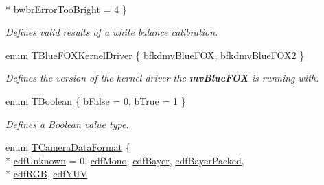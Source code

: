 \begin{DoxyCompactItemize}
\\*
\hyperlink{group___common_interface_ggac25746f6cbcf893d3ca308d3e978f39da1440b9f3f541551da4d0d8fe022587f4}{bwbr\+Error\+Too\+Bright} = 4
 \}
\begin{DoxyCompactList}\small\item\em Defines valid results of a white balance calibration. \end{DoxyCompactList}\item 
enum \hyperlink{group___common_interface_ga345b9d87a1305eb7b86a78750bd9e69f}{T\+Blue\+F\+O\+X\+Kernel\+Driver} \{ \hyperlink{group___common_interface_gga345b9d87a1305eb7b86a78750bd9e69fa51aaa69dccfaabec3836fa7e5e1ca4fa}{bfkdmv\+Blue\+F\+O\+X}, 
\hyperlink{group___common_interface_gga345b9d87a1305eb7b86a78750bd9e69fa0da9d56f43e35d1cb9ed753a1754de97}{bfkdmv\+Blue\+F\+O\+X2}
 \}
\begin{DoxyCompactList}\small\item\em Defines the version of the kernel driver the {\bfseries mv\+Blue\+F\+O\+X} is running with. \end{DoxyCompactList}\item 
enum \hyperlink{group___common_interface_ga43c995be18b0dde1eeb4a16849c58968}{T\+Boolean} \{ \hyperlink{group___common_interface_gga43c995be18b0dde1eeb4a16849c58968a3944d175144cb240912e853cf980a715}{b\+False} = 0, 
\hyperlink{group___common_interface_gga43c995be18b0dde1eeb4a16849c58968ac2ee8a1ca7dc97f0c2792a56f94c563b}{b\+True} = 1
 \}
\begin{DoxyCompactList}\small\item\em Defines a Boolean value type. \end{DoxyCompactList}\item 
enum \hyperlink{group___common_interface_ga36f9b405563c51f817554819cf981699}{T\+Camera\+Data\+Format} \{ \\*
\hyperlink{group___common_interface_gga36f9b405563c51f817554819cf981699a4b6272293752e20d38e13e37b60468da}{cdf\+Unknown} = 0, 
\hyperlink{group___common_interface_gga36f9b405563c51f817554819cf981699a59176ff235a20e3941350dd3346a1580}{cdf\+Mono}, 
\hyperlink{group___common_interface_gga36f9b405563c51f817554819cf981699a340d0399439d9dd3b06f919947fa9495}{cdf\+Bayer}, 
\hyperlink{group___common_interface_gga36f9b405563c51f817554819cf981699ac2fd76bd5789d445e8978ae9c207bf08}{cdf\+Bayer\+Packed}, 
\\*
\hyperlink{group___common_interface_gga36f9b405563c51f817554819cf981699a8739a6be38b3706c2c84b158c0dd88fa}{cdf\+R\+G\+B}, 
\hyperlink{group___common_interface_gga36f9b405563c51f817554819cf981699a9db7125fc44230788841c1ffb61e1a8d}{cdf\+Y\+U\+V}

\end{DoxyCompactItemize}
